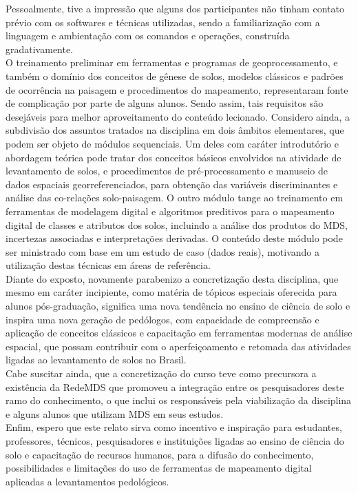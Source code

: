 Pessoalmente, tive a impressão que alguns dos participantes não tinham contato prévio com os softwares e técnicas utilizadas, sendo a familiarização com a linguagem e ambientação com os comandos e operações, construída gradativamente.\\
O treinamento preliminar em ferramentas e programas de geoprocessamento, e também o domínio dos conceitos de gênese de solos, modelos clássicos e padrões de ocorrência na paisagem e procedimentos do mapeamento, representaram fonte de complicação por parte de alguns alunos. Sendo assim, tais requisitos são desejáveis para melhor aproveitamento do conteúdo lecionado. Considero ainda, a subdivisão dos assuntos tratados na disciplina em dois âmbitos elementares, que podem ser objeto de módulos sequenciais. Um deles com caráter introdutório e abordagem teórica pode tratar dos conceitos básicos envolvidos na atividade de levantamento de solos, e procedimentos de pré-processamento e manuseio de dados espaciais georreferenciados, para obtenção das variáveis discriminantes e análise das co-relações solo-paisagem. O outro módulo tange ao treinamento em ferramentas de modelagem digital e algoritmos preditivos para o mapeamento digital de classes e atributos dos solos, incluindo a análise dos produtos do MDS, incertezas 
associadas e interpretações derivadas. O conteúdo deste módulo pode ser ministrado com base em um estudo de caso (dados reais), motivando a utilização destas técnicas em áreas de referência.\\
Diante do exposto, novamente parabenizo a concretização desta disciplina, que mesmo em caráter incipiente, como matéria de tópicos especiais oferecida para alunos pós-graduação, significa uma nova tendência no ensino de ciência de solo e inspira uma nova geração de pedólogos, com capacidade de compreensão e aplicação de conceitos clássicos e capacitação em ferramentas modernas de análise espacial, que possam contribuir com o aperfeiçoamento e retomada das atividades ligadas ao levantamento de solos no Brasil.\\
Cabe suscitar ainda, que a concretização do curso teve como precursora a existência da RedeMDS que promoveu a integração entre os pesquisadores deste ramo do conhecimento, o que inclui os responsáveis pela viabilização da disciplina e alguns alunos que utilizam MDS em seus estudos.\\
Enfim, espero que este relato sirva como incentivo e inspiração para estudantes, professores, técnicos, pesquisadores e instituições ligadas ao ensino de ciência do solo e capacitação de recursos humanos, para a difusão do conhecimento, possibilidades e limitações do uso de ferramentas de mapeamento digital aplicadas a levantamentos pedológicos.
